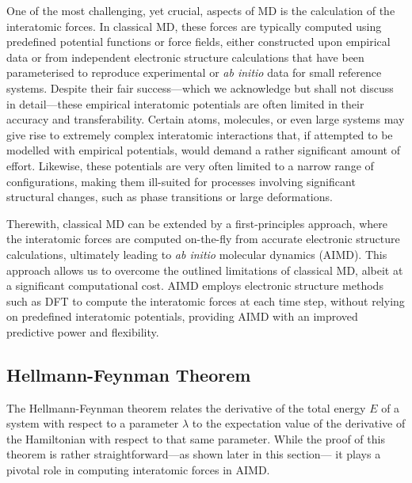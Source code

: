 One of the most challenging, yet crucial, aspects of MD is the calculation of the interatomic forces. In classical MD, these forces are typically computed using predefined potential functions or force fields, either constructed upon empirical data or from independent electronic structure calculations that have been parameterised to reproduce experimental or \emph{ab initio} data for small reference systems. Despite their fair success---which we acknowledge but shall not discuss in detail---these empirical interatomic potentials are often limited in their accuracy and transferability. Certain atoms, molecules, or even large systems may give rise to extremely complex interatomic interactions that, if attempted to be modelled with empirical potentials, would demand a rather significant amount of effort. Likewise, these potentials are very often limited to a narrow range of configurations, making them ill-suited for processes involving significant structural changes, such as phase transitions or large deformations.  

Therewith, classical MD can be extended by a first-principles approach, where the interatomic forces are computed on-the-fly from accurate electronic structure calculations, ultimately leading to \emph{ab initio} molecular dynamics (AIMD). This approach allows us to overcome the outlined limitations of classical MD, albeit at a significant computational cost. AIMD employs electronic structure methods such as DFT to compute the interatomic forces at each time step, without relying on predefined interatomic potentials, providing AIMD with an improved predictive power and flexibility.  


\subsection{Hellmann-Feynman Theorem}
 The Hellmann-Feynman theorem\supercite{Feynman1939, Politzer2018} relates the derivative of the total energy $E$ of a system with respect to a parameter $\lambda$ to the expectation value of the derivative of the Hamiltonian with respect to that same parameter.
 While the proof of this theorem is rather straightforward---as shown later in this section---
 it plays a pivotal role in computing interatomic forces in AIMD. 
 
